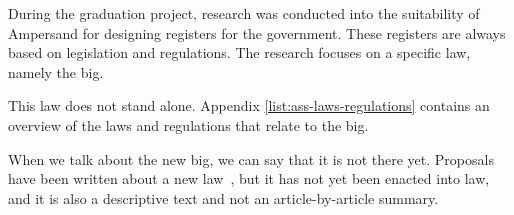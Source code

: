 During the graduation project, research was conducted into the suitability of Ampersand for designing registers for the government.
These registers are always based on legislation and regulations.
The research focuses on a specific law, namely the \acrshort{big}.

This law does not stand alone.
Appendix \ref{list:ass-laws-regulations} contains an overview of the laws and regulations that relate to the \acrshort{big}.

When we talk about the new \acrshort{big}, we can say that it is not there yet.
Proposals have been written about a new law~, but it has not yet been enacted into law, and it is also a descriptive text and not an article-by-article summary.

